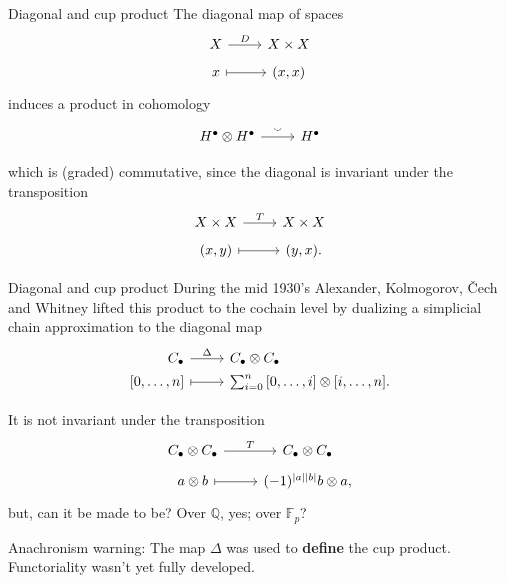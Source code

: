 \documentclass[10pt,t]{beamer}
\begin{document}
\begin{frame}[fragile]{Diagonal and cup product}
	The diagonal map of spaces
	\begin{equation*}
	\begin{tikzcd}[row sep = tiny]
	X \arrow[r, "D"] & X \times X \\
	x \arrow[r, |->]& (x, x)
	\end{tikzcd}
	\end{equation*}
	induces a product in cohomology 
	\begin{equation*}
	\begin{tikzcd}[row sep = tiny]
	H^\bullet \otimes H^\bullet \arrow[r, "\smallsmile"] & H^\bullet \\
	\end{tikzcd}
	\end{equation*}
	which is (graded) commutative, since the diagonal is invariant under the transposition
	\begin{equation*}
	\begin{tikzcd}[row sep = tiny]
	X \times X \arrow[r, "T"] & X \times X \\
	(x, y) \arrow[r, |->]& (y, x).
	\end{tikzcd}
	\end{equation*}
\end{frame}


\begin{frame}[fragile]{Diagonal and cup product}
	During the mid 1930's Alexander, Kolmogorov, \v{C}ech and Whitney lifted this product to the cochain level by dualizing a simplicial chain approximation to the diagonal map
	\begin{equation*}
	\begin{tikzcd}[%
	,row sep = 0ex
	,/tikz/column 1/.append style={anchor=base east}
	,/tikz/column 2/.append style={anchor=base west}
	]
	C_\bullet \arrow[r, "\Delta"] & C_\bullet \otimes C_\bullet \\
	{[0, \dots, n]} \arrow[r, |->] & \sum_{i=0}^{n} {[0, \dots, i] \otimes [i, \dots, n]}.
	\end{tikzcd}
	\end{equation*}

	\pause
		
	It is not invariant under the transposition
	\begin{equation*}
	\begin{tikzcd}[row sep = tiny]
	C_\bullet \otimes C_\bullet \arrow[r, "T"] & C_\bullet \otimes C_\bullet \\
	a \otimes b \arrow[r, |->]& (-1)^{|a||b|} b \otimes a,
	\end{tikzcd}
	\end{equation*}
	but, can it be made to be? \pause Over $\mathbb Q$, yes; over $\mathbb F_p$?
	
	\vspace*{10pt} \pause
	
	\textcolor{pblue}{Anachronism warning:} The map $\Delta$ was used to \textbf{define} the cup product. Functoriality wasn't yet fully developed.
\end{frame}
\end{document}
